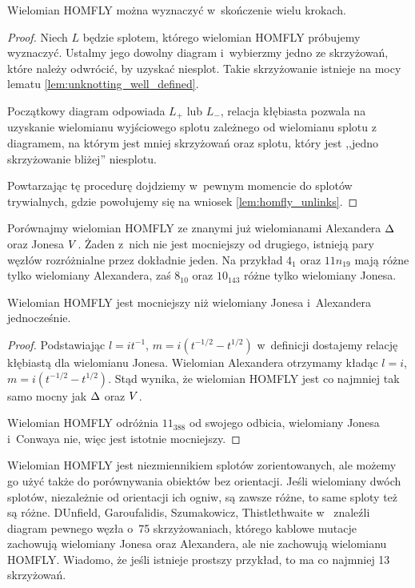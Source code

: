 \begin{proposition}
    Wielomian HOMFLY można wyznaczyć w~skończenie wielu krokach.
\end{proposition}

\begin{proof}
    Niech $L$ będzie splotem, którego wielomian HOMFLY próbujemy wyznaczyć.
    Ustalmy jego dowolny diagram i~wybierzmy jedno ze skrzyżowań, które należy odwrócić, by uzyskać niesplot.
    Takie skrzyżowanie istnieje na mocy lematu \ref{lem:unknotting_well_defined}.

    Początkowy diagram odpowiada $L_+$ lub $L_-$, relacja kłębiasta pozwala na uzyskanie wielomianu wyjściowego splotu zależnego od wielomianu splotu z
    diagramem, na którym jest mniej skrzyżowań oraz splotu, który jest ,,jedno skrzyżowanie bliżej'' niesplotu.

    Powtarzając tę procedurę dojdziemy w~pewnym momencie do splotów trywialnych, gdzie powołujemy się na wniosek \ref{lem:homfly_unlinks}.
\end{proof}

Porównajmy wielomian HOMFLY ze znanymi już wielomianami Alexandera $\Delta$ oraz Jonesa $V$.
Żaden z~nich nie jest mocniejszy od drugiego, istnieją pary węzłów rozróżnialne przez dokładnie jeden.
Na przykład $4_1$ oraz $11n_{19}$ mają różne tylko wielomiany Alexandera, zaś $8_{10}$ oraz $10_{143}$ różne tylko wielomiany Jonesa.

\begin{proposition}
\label{homfly_stronger}%
    Wielomian HOMFLY jest mocniejszy niż wielomiany Jonesa i~Alexandera jednocześnie.
\end{proposition}

\begin{proof}
    Podstawiając $l = it^{-1}$, $m = i(t^{-1/2} - t^{1/2})$ w~definicji dostajemy relację kłębiastą dla wielomianu Jonesa.
    Wielomian Alexandera otrzymamy kładąc $l = i$, $m = i(t^{-1/2} - t^{1/2})$.
    Stąd wynika, że wielomian HOMFLY jest co najmniej tak samo mocny jak $\Delta$ oraz $V$.

    Wielomian HOMFLY odróżnia $11_{388}$ od swojego odbicia, wielomiany Jonesa i~Conwaya nie, więc jest istotnie mocniejszy.
\end{proof}

Wielomian HOMFLY jest niezmiennikiem splotów zorientowanych, ale możemy go użyć także do porównywania obiektów bez orientacji.
Jeśli wielomiany dwóch splotów, niezależnie od orientacji ich ogniw, są zawsze różne, to same sploty też są różne.
DUnfield, Garoufalidis, Szumakowicz, Thistlethwaite w~\cite{dunfield10} znaleźli diagram pewnego węzła o~75 skrzyżowaniach, którego kablowe mutacje zachowują wielomiany Jonesa oraz Alexandera, ale nie zachowują wielomianu HOMFLY.
%
%
%
%
%
Wiadomo, że jeśli istnieje prostszy przykład, to ma co najmniej 13 skrzyżowań.

